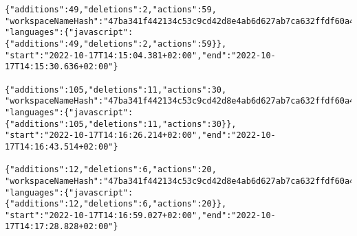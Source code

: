 \scriptsize{
\begin{verbatim}
{"additions":49,"deletions":2,"actions":59,
"workspaceNameHash":"47ba341f442134c53c9cd42d8e4ab6d627ab7ca632ffdf60a432c7c6e2df9544",
"languages":{"javascript":{"additions":49,"deletions":2,"actions":59}},
"start":"2022-10-17T14:15:04.381+02:00","end":"2022-10-17T14:15:30.636+02:00"}

{"additions":105,"deletions":11,"actions":30,
"workspaceNameHash":"47ba341f442134c53c9cd42d8e4ab6d627ab7ca632ffdf60a432c7c6e2df9544",
"languages":{"javascript":{"additions":105,"deletions":11,"actions":30}},
"start":"2022-10-17T14:16:26.214+02:00","end":"2022-10-17T14:16:43.514+02:00"}

{"additions":12,"deletions":6,"actions":20,
"workspaceNameHash":"47ba341f442134c53c9cd42d8e4ab6d627ab7ca632ffdf60a432c7c6e2df9544",
"languages":{"javascript":{"additions":12,"deletions":6,"actions":20}},
"start":"2022-10-17T14:16:59.027+02:00","end":"2022-10-17T14:17:28.828+02:00"}
\end{verbatim}
}
